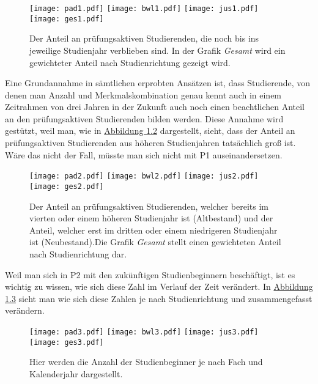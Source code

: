 \begin{figure}[ht]
  \label{fig:abb1}
  \texttt{[image: pad1.pdf]}
  \texttt{[image: bwl1.pdf]}
  \texttt{[image: jus1.pdf]}
  \texttt{[image: ges1.pdf]}
  \caption[Anteil an pr\"ufungsaktiven Studierenden nach Studienjahr und -richtung]{Der Anteil an pr\"ufungsaktiven Studierenden, die noch bis ins jeweilige
    Studienjahr verblieben sind. In der Grafik \textit{Gesamt} wird ein gewichteter
    Anteil nach Studienrichtung gezeigt wird.}
\end{figure}

Eine Grundannahme in s\"amtlichen erprobten Ans\"atzen ist, dass Studierende, von denen man Anzahl und Merkmalskombination genau kennt auch in einem Zeitrahmen von
drei Jahren in der Zukunft auch noch einen beachtlichen Anteil an den pr\"ufungsaktiven Studierenden bilden werden. Diese Annahme wird gest\"utzt, weil man, wie in \hyperref[fig:abb2]{Abbildung 1.2}
dargestellt, sieht, dass der Anteil an pr\"ufungsaktiven Studierenden aus h\"oheren Studienjahren tats\"achlich gro{\ss} ist. W\"are das nicht der Fall, m\"usste man sich nicht mit
P1 auseinandersetzen.

\begin{figure}[ht]
  \label{fig:abb2}
  \texttt{[image: pad2.pdf]}
  \texttt{[image: bwl2.pdf]}
  \texttt{[image: jus2.pdf]}
  \texttt{[image: ges2.pdf]}
  \caption[Anteile des Neu- und Altbestandes an aktiven Studierenden]{Der Anteil an prüfungsaktiven Studierenden, welcher bereits im vierten oder einem höheren
    Studienjahr ist (Altbestand) und der Anteil, welcher erst im dritten oder einem niedrigeren Studienjahr ist (Neubestand).Die Grafik \textit{Gesamt} stellt einen gewichteten
    Anteil nach Studienrichtung dar.}
\end{figure}

Weil man sich in P2 mit den zuk\"unftigen Studienbeginnern besch\"aftigt, ist es wichtig zu wissen, wie sich diese Zahl im Verlauf der Zeit ver\"andert. In
\hyperref[fig:abb3]{Abbildung 1.3} sieht man wie sich diese Zahlen je nach Studienrichtung und zusammengefasst ver\"andern.

\begin{figure}[ht]
  \label{fig:abb3}
  \texttt{[image: pad3.pdf]}
  \texttt{[image: bwl3.pdf]}
  \texttt{[image: jus3.pdf]}
  \texttt{[image: ges3.pdf]}
  \caption[Anzahl der Studienbeginner nach Fach und Kalenderjahr]{Hier werden die Anzahl der Studienbeginner je nach Fach und Kalenderjahr dargestellt.}
\end{figure}

